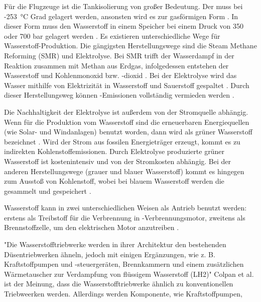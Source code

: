 Für die Flugzeuge ist die Tankisolierung von großer Bedeutung. Der  muss bei -253 °C Grad gelagert werden, 
ansonsten wird es zur gasförmigen Form \cite{colpan2022fuel}. In dieser Form muss den Wasserstoff in einem Speicher
bei einem Druck von 350 oder 700 bar gelagert werden \cite{colpan2022fuel}.
%
Es existieren unterschiedliche Wege für Wasserstoff-Produktion. 
Die gängigsten Herstellungswege sind die Steam Methane Reforming (SMR) und Elektrolyse. %
Bei SMR trifft der Wasserdampf in der Reaktion zusammen mit Methan aus Erdgas, infolgedessen entstehen 
der Wasserstoff  und Kohlenmonoxid bzw. -dioxid \cite{mulder2019outlook}. Bei der Elektrolyse wird das Wasser mithilfe von Elektrizität 
in Wasserstoff und Sauerstoff  gespaltet \cite{mulder2019outlook}. Durch dieser Herstellungsweg können -Emissionen 
vollständig vermieden werden \cite{dalmia2022powering}. 

Die Nachhaltigkeit der Elektrolyse ist außerdem von der Stromquelle abhängig. 
Wenn für die Produktion vom Wasserstoff sind die erneuerbaren Energiequellen (wie Solar- und Windanlagen) benutzt worden, 
dann wird als grüner Wasserstoff bezeichnet \cite{mulder2019outlook}. 
Wird der Strom aus fossilen Energieträger erzeugt, kommt es zu indirekten Kohlenstoffemissionen.
Durch Elektrolyse produzierte grüner Wasserstoff ist kostenintensiv \cite{dalmia2022powering} und von der Stromkosten abhängig. 
Bei der anderen Herstellungswege (grauer und blauer Wasserstoff)
kommt es hingegen zum Ausstoß von Kohlenstoff, wobei bei blauem Wasserstoff werden die  gesammelt und gespeichert \cite{mulder2019outlook}.
%

Wasserstoff kann in zwei unterschiedlichen Weisen als Antrieb benutzt werden: 
erstens als Treibstoff für die Verbrennung in -Verbrennungsmotor,
zweitens als Brennstoffzelle, um den elektrischen Motor anzutreiben \cite{sky2020hydrogen}.

"Die Wasserstofftriebwerke werden in ihrer Architektur den bestehenden Düsentriebwerken ähneln, 
jedoch mit einigen Ergänzungen, wie z. B. Kraftstoffpumpen und -steuergeräten, Brennkammern und
 einem zusätzlichen Wärmetauscher zur Verdampfung von flüssigem Wasserstoff (LH2)" \cite{colpan2022fuel}
Colpan et al. \cite{colpan2022fuel} ist der Meinung, dass die Wasserstofftriebwerke ähnlich zu konventionellen Triebweerken werden. Allerdings
werden Komponente, wie Kraftstoffpumpen, 

